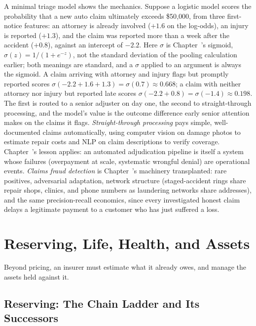 \documentclass[../ai_in_finance]{subfiles}
\begin{document}
A minimal triage model shows the mechanics. Suppose a logistic model scores the probability that a new auto claim ultimately exceeds \$50{,}000, from three first-notice features: an attorney is already involved ($+1.6$ on the log-odds), an injury is reported ($+1.3$), and the claim was reported more than a week after the accident ($+0.8$), against an intercept of $-2.2$. Here $\sigma$ is Chapter~'s sigmoid, $\sigma(z) = 1/(1+e^{-z})$, not the standard deviation of the pooling calculation earlier; both meanings are standard, and a $\sigma$ applied to an argument is always the sigmoid. A claim arriving with attorney and injury flags but promptly reported scores $\sigma(-2.2 + 1.6 + 1.3) = \sigma(0.7) \approx 0.668$; a claim with neither attorney nor injury but reported late scores $\sigma(-2.2 + 0.8) = \sigma(-1.4) \approx 0.198$. The first is routed to a senior adjuster on day one, the second to straight-through processing, and the model's value is the outcome difference early senior attention makes on the claims it flags. \emph{Straight-through processing} pays simple, well-documented claims automatically, using computer vision on damage photos to estimate repair costs and NLP on claim descriptions to verify coverage. Chapter~'s lesson applies: an automated adjudication pipeline is itself a system whose failures (overpayment at scale, systematic wrongful denial) are operational events. \emph{Claims fraud detection} is Chapter~'s machinery transplanted: rare positives, adversarial adaptation, network structure (staged-accident rings share repair shops, clinics, and phone numbers as laundering networks share addresses), and the same precision-recall economics, since every investigated honest claim delays a legitimate payment to a customer who has just suffered a loss.

\section{Reserving, Life, Health, and Assets}

Beyond pricing, an insurer must estimate what it already owes, and manage the assets held against it.

\subsection{Reserving: The Chain Ladder and Its Successors}
\label{sec:ins-reserving}
\end{document}
